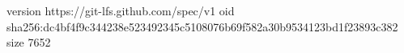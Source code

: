 version https://git-lfs.github.com/spec/v1
oid sha256:dc4bf4f9c344238e523492345c5108076b69f582a30b9534123bd1f23893c382
size 7652
